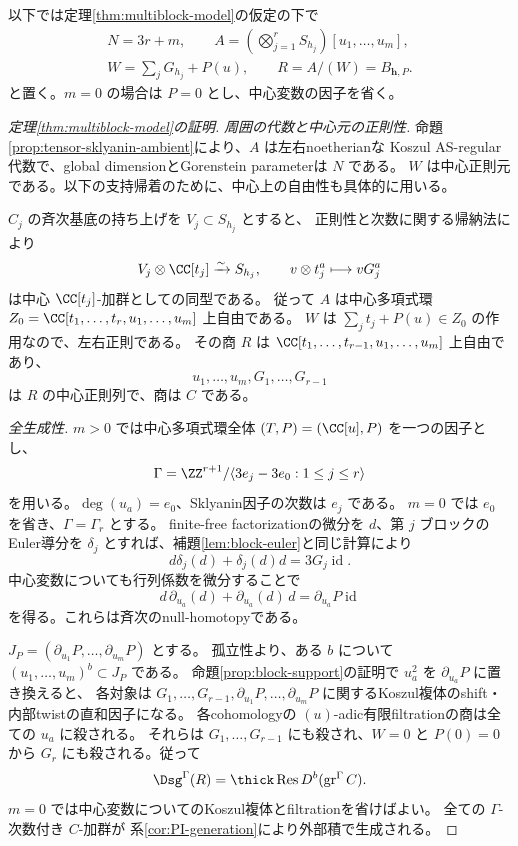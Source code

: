 以下では定理\ref{thm:multiblock-model}の仮定の下で
\[
 \begin{gathered}
 N=3r+m,\qquad A=\left(\bigotimes_{j=1}^rS_{h_j}\right)[u_1,\ldots,u_m],\\
 W=\sum_jG_{h_j}+P(u),\qquad R=A/(W)=B_{\mathbf h,P}.
 \end{gathered}
\]
と置く。\(m=0\) の場合は \(P=0\) とし、中心変数の因子を省く。

\begin{proof}[定理\ref{thm:multiblock-model}の証明]

 \emph{周囲の代数と中心元の正則性.}
 命題\ref{prop:tensor-sklyanin-ambient}により、\(A\) は左右noetherianな
 Koszul AS-regular代数で、global dimensionとGorenstein parameterは \(N\) である。
 \(W\) は中心正則元である。以下の支持帰着のために、中心上の自由性も具体的に用いる。

 \(C_j\) の斉次基底の持ち上げを \(V_j\subset S_{h_j}\) とすると、
 正則性と次数に関する帰納法により
 \[
 V_j\otimes\CC[t_j]\xrightarrow{\sim}S_{h_j},\qquad
 v\otimes t_j^a\longmapsto vG_j^a
 \]
 は中心 \(\CC[t_j]\)-加群としての同型である。
 従って \(A\) は中心多項式環
 \(Z_0=\CC[t_1,\ldots,t_r,u_1,\ldots,u_m]\) 上自由である。
 \(W\) は \(\sum_jt_j+P(u)\in Z_0\) の作用なので、左右正則である。
 その商 \(R\) は
 \(\CC[t_1,\ldots,t_{r-1},u_1,\ldots,u_m]\) 上自由であり、
 \[
 u_1,\ldots,u_m,G_1,\ldots,G_{r-1}
 \]
 は \(R\) の中心正則列で、商は \(C\) である。

 \emph{全生成性.}
 \(m>0\) では中心多項式環全体 \((T,P)=(\CC[u],P)\) を一つの因子とし、
 \[
 \Gamma=\ZZ^{r+1}/\langle3e_j-3e_0:1\le j\le r\rangle
 \]
 を用いる。\(\deg(u_a)=e_0\)、Sklyanin因子の次数は \(e_j\) である。
 \(m=0\) では \(e_0\) を省き、\(\Gamma=\Gamma_r\) とする。
 finite-free factorizationの微分を \(d\)、第 \(j\) ブロックのEuler導分を
 \(\delta_j\) とすれば、補題\ref{lem:block-euler}と同じ計算により
 \[
 d\delta_j(d)+\delta_j(d)d=3G_j\operatorname{id}.
 \]
 中心変数についても行列係数を微分することで
 \[
 d\,\partial_{u_a}(d)+\partial_{u_a}(d)\,d
 =\partial_{u_a}P\operatorname{id}
 \]
 を得る。これらは斉次のnull-homotopyである。

 \(J_P=(\partial_{u_1}P,\ldots,\partial_{u_m}P)\) とする。
 孤立性より、ある \(b\) について \((u_1,\ldots,u_m)^b\subset J_P\) である。
 命題\ref{prop:block-support}の証明で \(u_a^2\) を \(\partial_{u_a}P\) に置き換えると、
 各対象は \(G_1,\ldots,G_{r-1},\partial_{u_1}P,\ldots,\partial_{u_m}P\)
 に関するKoszul複体のshift・内部twistの直和因子になる。
 各cohomologyの \((u)\)-adic有限filtrationの商は全ての \(u_a\) に殺される。
 それらは \(G_1,\ldots,G_{r-1}\) にも殺され、\(W=0\) と \(P(0)=0\) から
 \(G_r\) にも殺される。従って
 \[
 \Dsg^\Gamma(R)
 =\thick\operatorname{Res}D^b(\operatorname{gr}^\Gamma C).
 \]
 \(m=0\) では中心変数についてのKoszul複体とfiltrationを省けばよい。
 全ての \(\Gamma\)-次数付き \(C\)-加群が
 系\ref{cor:PI-generation}により外部積で生成される。


\end{proof}
